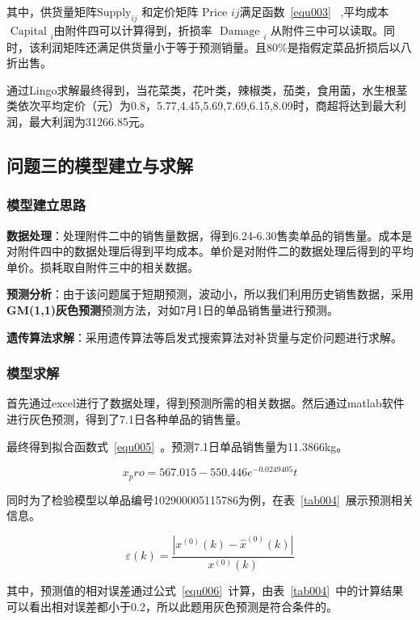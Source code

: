 \documentclass{cumcmthesis}
\begin{document}
其中，供货量矩阵$\text{Supply}_{i j}$ 和定价矩阵$\text { Price } i j$满足函数~\ref{equ003}~ ,平均成本$\text { Capital }_i$由附件四可以计算得到，折损率 $\text { Damage }_i$ 从附件三中可以读取。同时，该利润矩阵还满足供货量小于等于预测销量。且80\%是指假定菜品折损后以八折出售。

通过Lingo求解最终得到，当花菜类，花叶类，辣椒类，茄类，食用菌，水生根茎类依次平均定价（元）为0.8，5.77,4.45,5.69,7.69,6.15,8.09时，商超将达到最大利润，最大利润为31266.85元。

\subsection{问题三的模型建立与求解}
\subsubsection{模型建立思路}
\textbf{数据处理}：处理附件二中的销售量数据，得到6.24-6.30售卖单品的销售量。成本是对附件四中的数据处理后得到平均成本。单价是对附件二的数据处理后得到的平均单价。损耗取自附件三中的相关数据。

\textbf{预测分析}：由于该问题属于短期预测，波动小，所以我们利用历史销售数据，采用\textbf{GM(1,1)灰色预测}预测方法，对如7月1日的单品销售量进行预测。

\textbf{遗传算法求解}：采用遗传算法等启发式搜索算法对补货量与定价问题进行求解。

\subsubsection{模型求解}
首先通过excel进行了数据处理，得到预测所需的相关数据。然后通过matlab软件进行灰色预测，得到了7.1日各种单品的销售量。

最终得到拟合函数式~\ref{equ005}~。预测7.1日单品销售量为11.3866kg。

\begin{equation}\label{equ005} 
	x_pro = 567.015-550.446e^{-0.0249405}t
\end{equation}


同时为了检验模型以单品编号102900005115786为例，在表~\ref{tab004}~展示预测相关信息。

\begin{equation}\label{equ006} 
	\varepsilon(k)=\frac{\left|x^{(0)}(k)-\hat{x}^{(0)}(k)\right|}{x^{(0)}(k)}
\end{equation}


其中，预测值的相对误差通过公式~\ref{equ006}~计算，由表~\ref{tab004}~中的计算结果可以看出相对误差都小于0.2，所以此题用灰色预测是符合条件的。
\end{document}
